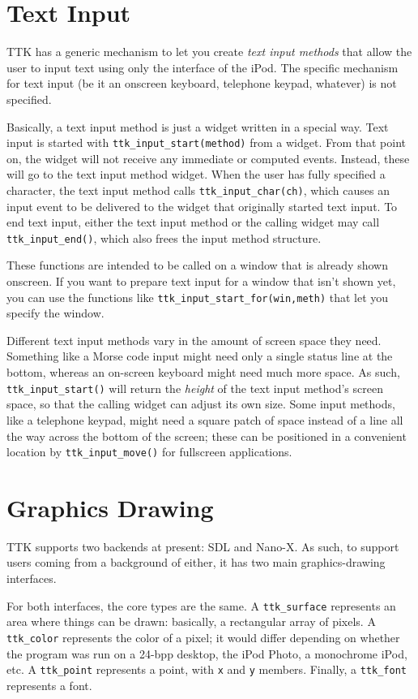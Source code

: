 \documentclass[12pt,letterpaper]{report}
\begin{document}
\section{Text Input}
TTK has a generic mechanism to let you create {\sl text input methods} that allow the user to input
text using only the interface of the iPod. The specific mechanism for text input (be it an onscreen
keyboard, telephone keypad, whatever) is not specified.

Basically, a text input method is just a widget written in a special way. Text input is started
with \verb|ttk_input_start(method)| from a widget. From that point on, the widget will not receive
any immediate or computed events. Instead, these will go to the text input method widget. When the
user has fully specified a character, the text input method calls \verb|ttk_input_char(ch)|, which
causes an {\sf input} event to be delivered to the widget that originally started text input.
To end text input, either the text input method or the calling widget may call \verb|ttk_input_end()|,
which also frees the input method structure.

These functions are intended to be called on a window that is already shown onscreen. If you
want to prepare text input for a window that isn't shown yet, you can use the functions like
\verb|ttk_input_start_for(win,meth)| that let you specify the window.

Different text input methods vary in the amount of screen space they need. Something like a Morse code
input might need only a single status line at the bottom, whereas an on-screen keyboard might need
much more space. As such, \verb|ttk_input_start()| will return the {\em height} of the text input method's
screen space, so that the calling widget can adjust its own size. Some input methods, like a telephone keypad,
might need a square patch of space instead of a line all the way across the bottom of the screen;
these can be positioned in a convenient location by \verb|ttk_input_move()| for fullscreen applications.

\section{Graphics Drawing}
TTK supports two backends at present: SDL and Nano-X. As such, to support users coming from a background
of either, it has two main graphics-drawing interfaces.

For both interfaces, the core types are the same. A \verb|ttk_surface| represents an area where things
can be drawn: basically, a rectangular array of pixels. A \verb|ttk_color| represents the
color of a pixel; it would differ depending on whether the program was run on a 24-bpp desktop, the iPod
Photo, a monochrome iPod, etc. A \verb|ttk_point| represents a point, with \verb|x| and \verb|y| members.
Finally, a \verb|ttk_font| represents a font.
\end{document}
